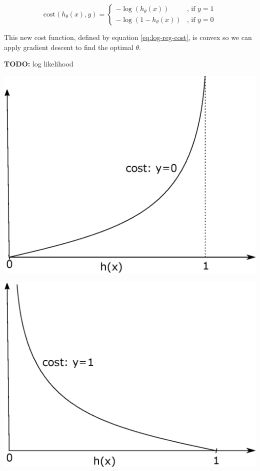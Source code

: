 \documentclass[a4paper,11pt]{report}
\newcommand{\cost}{\mathrm{cost}}
\begin{document}
$$\cost(h_\theta(x), y) = \left\{\begin{matrix}
                                    -\log(h_\theta(x)) & \text{, if } y = 1 \\
                                    -\log(1 - h_\theta(x)) & \text{, if } y = 0
                                  \end{matrix}\right.$$

This new cost function, defined by equation \eqref{eq:log-reg-cost}, is convex so we can apply gradient descent to find the optimal $\theta$.

\textbf{TODO:} log likelihood

\hspace{1.0in}

\begin{center}
\begin{minipage}{0.48\textwidth}
 \centering
 \includegraphics[width=.8\linewidth]{Images/cost_0}
\end{minipage}\hfill
\begin{minipage}{0.48\textwidth}
 \centering
 \includegraphics[width=.8\linewidth]{Images/cost_1}
\end{minipage}
\end{center}
\end{document}
